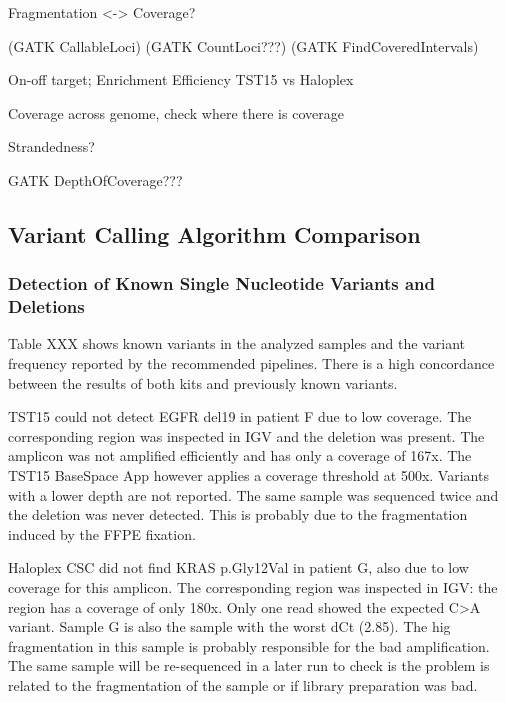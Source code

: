Fragmentation <-> Coverage?

(GATK CallableLoci)
(GATK CountLoci???)
(GATK FindCoveredIntervals)

On-off target; Enrichment Efficiency TST15 vs Haloplex

Coverage across genome, check where there is coverage

Strandedness?

GATK DepthOfCoverage???

\subsection{Variant Calling Algorithm Comparison}

\subsubsection{Detection of Known Single Nucleotide Variants and Deletions}

Table XXX shows known variants in the analyzed samples and the variant frequency
reported by the recommended pipelines. There is a high concordance between  the
results of both kits and previously known variants.

TST15 could not detect EGFR del19 in patient F due to low coverage. The
corresponding region was inspected in IGV and the deletion was present.  The
amplicon was not amplified  efficiently and has only a coverage of 167x. The
TST15 BaseSpace App however  applies a coverage threshold at 500x. Variants with
a lower depth are not reported. The same sample was sequenced twice and the
deletion was never detected. This is probably due to the fragmentation induced
by the FFPE fixation.

Haloplex CSC did not find KRAS p.Gly12Val in patient G, also due to low coverage
for this amplicon. The corresponding region was inspected in IGV: the region has
a coverage of only 180x. Only one read showed the expected C>A variant.  Sample
G is also the sample with the worst dCt (2.85). The  hig fragmentation in this
sample is probably responsible for the bad amplification. The same sample will
be re-sequenced in a later run to check  is the problem is related to the
fragmentation of the sample or if library preparation was bad.

